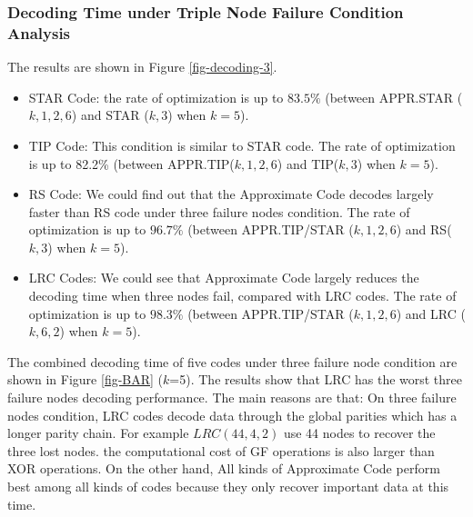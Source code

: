 \documentclass[sigconf]{acmart}
\begin{document}
\subsubsection{Decoding Time under Triple Node Failure Condition Analysis}
The results are shown in Figure \ref{fig-decoding-3}.
\begin{itemize}
    \item STAR Code: the rate of optimization is up to $83.5\%$ (between APPR.STAR ($k,1,2,6$) and STAR ($k,3$) when $k = 5$).
    \item TIP Code: This condition is similar to STAR code. The rate of optimization is up to 82.2\% (between APPR.TIP($k,1,2,6$) and TIP($k,3$) when $k = 5$).
    \item RS Code: We could find out that the Approximate Code decodes largely faster than RS code under three failure nodes condition. The rate of optimization is up to $96.7\%$ (between APPR.TIP/STAR ($k,1,2,6$) and RS($k,3$) when $k = 5$).
    \item LRC Codes:
    We could see that Approximate Code largely reduces the decoding time when three nodes fail, compared with LRC codes. The rate of optimization is up to $98.3\%$  (between APPR.TIP/STAR ($k,1,2,6$) and LRC ($k, 6, 2$) when $k = 5$).
\end{itemize}

The combined decoding time of five codes under three failure node condition are shown in Figure \ref{fig-BAR} ($k$=5). The results show that LRC has the worst three failure nodes decoding performance. The main reasons are that: On three failure nodes condition, LRC codes decode data through the global parities which has a longer parity chain. For example $LRC (44,4,2)$ use 44 nodes to recover the three lost nodes. the computational cost of GF operations is also larger than XOR operations. On the other hand, All kinds of Approximate Code perform best among all kinds of codes because they only recover important data at this time.
\end{document}
